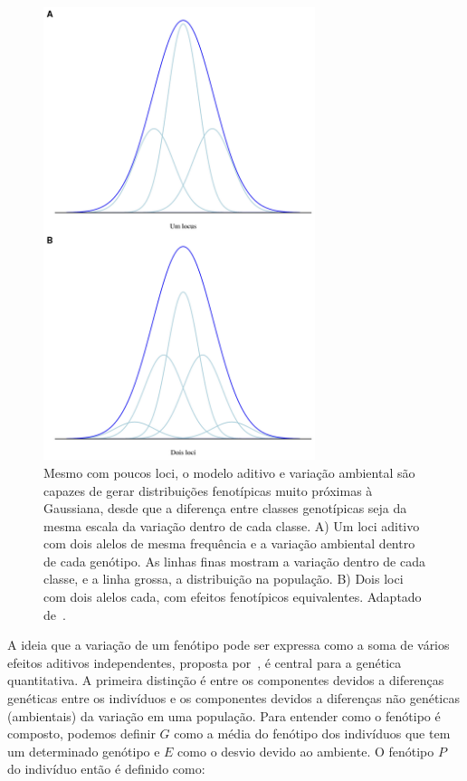 \begin{refsection}
\begin{figure}
    \centering
    \includegraphics[width=300px]{discrete_gaussian.png}
    \caption[Variação contínua]{Mesmo com poucos loci, o modelo aditivo e variação ambiental são capazes de gerar distribuições fenotípicas muito próximas à Gaussiana, desde que a diferença entre classes genotípicas seja da mesma escala da variação dentro de cada classe. A) Um loci aditivo com dois alelos de mesma frequência e a variação ambiental dentro de cada genótipo. As linhas finas mostram a variação dentro de cada classe, e a linha grossa, a distribuição na população. B) Dois loci com dois alelos cada, com efeitos fenotípicos equivalentes. Adaptado de~\textcite{Barton2007-hq}.}
    \label{discrete_aleles}
\end{figure}

A ideia que a variação de um fenótipo pode ser expressa como a soma de vários
efeitos aditivos independentes, proposta por~\textcite{Fisher1918-rm}, é
central para a genética quantitativa. A primeira distinção é entre os
componentes devidos a diferenças genéticas entre os indivíduos e os componentes
devidos a diferenças não genéticas (ambientais) da variação em uma população.
Para entender como o fenótipo é composto, podemos definir $G$ como a média do
fenótipo dos indivíduos que tem um determinado genótipo e $E$ como o desvio
devido ao ambiente. O fenótipo $P$ do indivíduo então é definido como:


\end{refsection}
